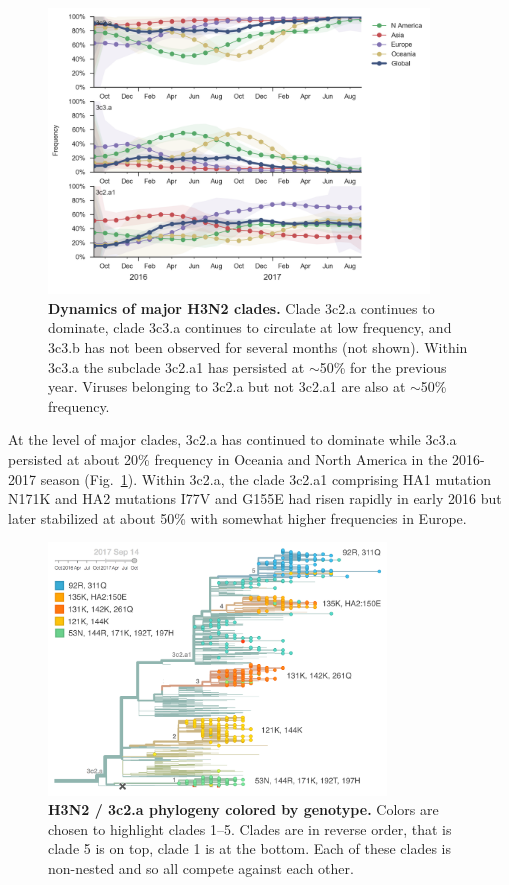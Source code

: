 \documentclass[11pt,oneside,letterpaper]{article}
\newcommand{\FIG}[1]{Fig.~\ref{#1}}
\begin{document}
\clearpage
\begin{figure}[H]
  \centering
  \includegraphics[width=0.9\textwidth]{../figures/sep-2017/h3n2_clades.png}
  \caption{\textbf{Dynamics of major H3N2 clades.} Clade 3c2.a continues to dominate, clade 3c3.a continues to circulate at low frequency, and 3c3.b has not been observed for several months (not shown). Within 3c3.a the subclade 3c2.a1 has persisted at $\sim$50\% for the previous year. Viruses belonging to 3c2.a but not 3c2.a1 are also at $\sim$50\% frequency.}
  \label{h3n2_clades}
\end{figure}
At the level of major clades, 3c2.a has continued to dominate while
3c3.a persisted at about 20\% frequency in Oceania and North America in
the 2016-2017 season (\FIG{h3n2_clades}). Within 3c2.a, the clade 3c2.a1 comprising HA1
mutation N171K and HA2 mutations I77V and G155E had risen rapidly in
early 2016 but later stabilized at about 50\% with somewhat higher
frequencies in Europe.

\clearpage
\begin{figure}[H]
  \centering
  \includegraphics[width=0.8\textwidth]{../figures/sep-2017/h3n2_tree.png}
  \caption{\textbf{H3N2 / 3c2.a phylogeny colored by genotype.} Colors are chosen to highlight clades 1--5. Clades are in reverse order, that is clade 5 is on top, clade 1 is at the bottom. Each of these clades is non-nested and so all compete against each other.
  }
  \label{h3n2_tree}
\end{figure}
\end{document}
